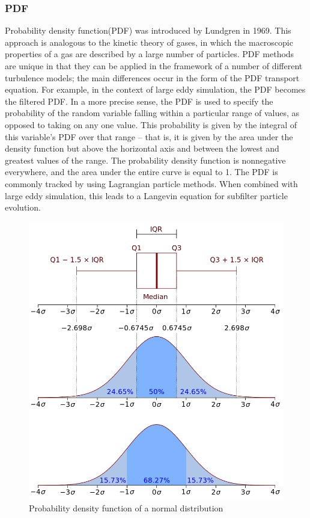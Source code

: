 \subsubsection{PDF}
	Probability density function(PDF) was introduced by Lundgren in 1969\cite{Lundgren1969}. This approach is analogous to the kinetic theory of gases, in which the macroscopic properties of a gas are described by a large number of particles. PDF methods are unique in that they can be applied in the framework of a number of different turbulence models; the main differences occur in the form of the PDF transport equation. For example, in the context of large eddy simulation, the PDF becomes the filtered PDF. In a more precise sense, the PDF is used to specify the probability of the random variable falling within a particular range of values, as opposed to taking on any one value. This probability is given by the integral of this variable's PDF over that range -- that is, it is given by the area under the density function but above the horizontal axis and between the lowest and greatest values of the range. The probability density function is nonnegative everywhere, and the area under the entire curve is equal to 1. The PDF is commonly tracked by using Lagrangian particle methods. When combined with large eddy simulation, this leads to a Langevin equation for subfilter particle evolution.
	\begin{figure}[H]
		\centering
		\includegraphics[width=0.7\linewidth]{../Assets/pdfplot}
		\caption{Probability density function of a normal distribution}
		\label{fig:pdfplot}
	\end{figure}
	
